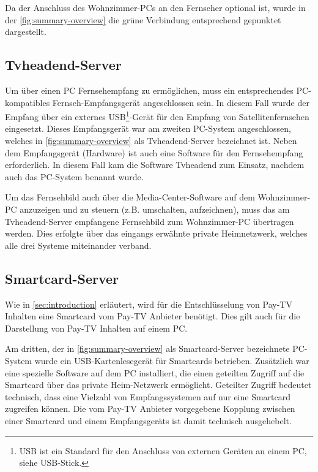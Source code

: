Da der Anschluss des Wohnzimmer-PCs an den Fernseher optional ist, wurde in der \autoref{fig:summary-overview} die grüne Verbindung entsprechend gepunktet dargestellt.

\subsection{Tvheadend-Server}

Um über einen PC Fernsehempfang zu ermöglichen, muss ein entsprechendes PC-kompatibles Fernseh-Empfangsgerät angeschlossen sein. In diesem Fall wurde der Empfang über ein externes USB\footnote{USB ist ein Standard für den Anschluss von externen Geräten an einem PC, siehe USB-Stick.}-Gerät für den Empfang von Satellitenfernsehen eingesetzt. Dieses Empfangsgerät war am zweiten PC-System angeschlossen, welches in \autoref{fig:summary-overview} als Tvheadend-Server bezeichnet ist. Neben dem Empfangsgerät (Hardware) ist auch eine Software für den Fernsehempfang erforderlich. In diesem Fall kam die Software Tvheadend zum Einsatz, nachdem auch das PC-System benannt wurde.

Um das Fernsehbild auch über die Media-Center-Software auf dem Wohnzimmer-PC anzuzeigen und zu steuern (z.B. umschalten, aufzeichnen), muss das am Tvheadend-Server empfangene Fernsehbild zum Wohnzimmer-PC übertragen werden. Dies erfolgte über das eingangs erwähnte private Heimnetzwerk, welches alle drei Systeme miteinander verband.

\subsection{Smartcard-Server}

Wie in \autoref{sec:introduction} erläutert, wird für die Entschlüsselung von Pay-TV Inhalten eine Smartcard vom Pay-TV Anbieter benötigt. Dies gilt auch für die Darstellung von Pay-TV Inhalten auf einem PC. 

Am dritten, der in \autoref{fig:summary-overview} als Smartcard-Server bezeichnete PC-System wurde ein USB-Kartenlesegerät für Smartcards betrieben. Zusätzlich war eine spezielle Software auf dem PC installiert, die einen geteilten Zugriff auf die Smartcard über das private Heim-Netzwerk ermöglicht. Geteilter Zugriff bedeutet technisch, dass eine Vielzahl von Empfangssystemen auf nur eine Smartcard zugreifen können. Die vom Pay-TV Anbieter vorgegebene Kopplung zwischen einer Smartcard und einem Empfangsgeräts ist damit technisch ausgehebelt.

